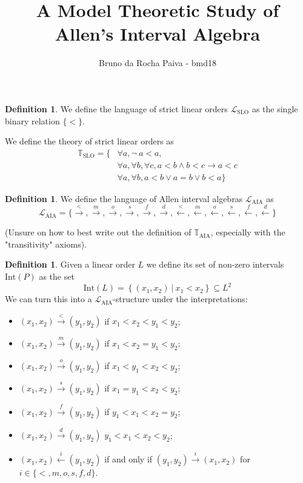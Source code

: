 \documentclass[11pt %
              ]{article}
\title{A Model Theoretic Study of Allen's Interval Algebra}
\author{Bruno da Rocha Paiva - bmd18}
\date{} %
\newcommand{\lang}{\mathcal{L}}
\newcommand{\theory}{\mathbb{T}}
\newcommand{\lslo}{\lang_\text{SLO}}
\newcommand{\tslo}{\theory_\text{SLO}}
\newcommand{\laia}{\lang_\text{AIA}}
\newcommand{\taia}{\theory_\text{AIA}}
\newcommand{\before}{\overset{<}{\longrightarrow}}
\newcommand{\meets}{\overset{m}{\longrightarrow}}
\newcommand{\overlaps}{\overset{o}{\longrightarrow}}
\newcommand{\starts}{\overset{s}{\longrightarrow}}
\newcommand{\finishes}{\overset{f}{\longrightarrow}}
\newcommand{\contained}{\overset{d}{\longrightarrow}}
\newcommand{\after}{\overset{<}{\longleftarrow}}
\newcommand{\metby}{\overset{m}{\longleftarrow}}
\newcommand{\overlappedby}{\overset{o}{\longleftarrow}}
\newcommand{\startedby}{\overset{s}{\longleftarrow}}
\newcommand{\finishedby}{\overset{f}{\longleftarrow}}
\newcommand{\contains}{\overset{d}{\longleftarrow}}
\newcommand{\inter}[1][-]{\text{Int}\left(#1\right)}
\theoremstyle{plain}
\theoremstyle{definition}
\newtheorem{defn}[thm]{Definition}
\theoremstyle{remark}
\begin{document}
\maketitle

\begin{defn}
  We define the language of strict linear orders $\lslo$ as the single binary relation $\{ < \}$.

  We define the theory of strict linear orders as
  \begin{align*}
    \tslo = \{ & \forall a, \lnot\ a < a, \\
              & \forall a, \forall b, \forall c, a < b \land b < c \rightarrow a < c \\
              & \forall a, \forall b, a < b \lor a = b \lor b < a \}
  \end{align*}
\end{defn}

\begin{defn}
  We define the language of Allen interval algebras $\laia$ as 
  \begin{equation*}
    \laia = \{ \before, \meets, \overlaps, \starts, \finishes, \contained,
               \after, \metby, \overlappedby, \startedby, \finishedby, \contains \}
  \end{equation*}

  (Unsure on how to best write out the definition of $\taia$, especially with the "transitivity"
  axioms).
\end{defn}


\begin{defn}
  Given a linear order $L$ we define its set of non-zero intervals $\inter[P]$ as the set
  \begin{equation*}
    \inter[L] = \left\{(x_1,x_2)\ |\ x_1 < x_2 \right\} \subseteq L^2
  \end{equation*}
  We can turn this into a $\laia$-structure under the interpretations:
  \begin{itemize}
    \item $(x_1,x_2) \before (y_1,y_2)$ if $x_1<x_2<y_1<y_2$;
    \item $(x_1,x_2) \meets (y_1,y_2)$ if $x_1<x_2=y_1<y_2$;
    \item $(x_1,x_2) \overlaps (y_1,y_2)$ if $x_1<y_1<x_2<y_2$;
    \item $(x_1,x_2) \starts (y_1,y_2)$ if $x_1=y_1<x_2<y_2$;
    \item $(x_1,x_2) \finishes (y_1,y_2)$ if $y_1<x_1<x_2=y_2$;
    \item $(x_1,x_2) \contained (y_1,y_2)$ $y_1<x_1<x_2<y_2$;
    \item $(x_1,x_2) \overset{i}{\longleftarrow} (y_1,y_2)$ if and only if
      $(y_1,y_2) \overset{i}{\longrightarrow} (x_1,x_2)$ for $i \in \{<,m,o,s,f,d\}$.
  \end{itemize}
\end{defn}
\end{document}
